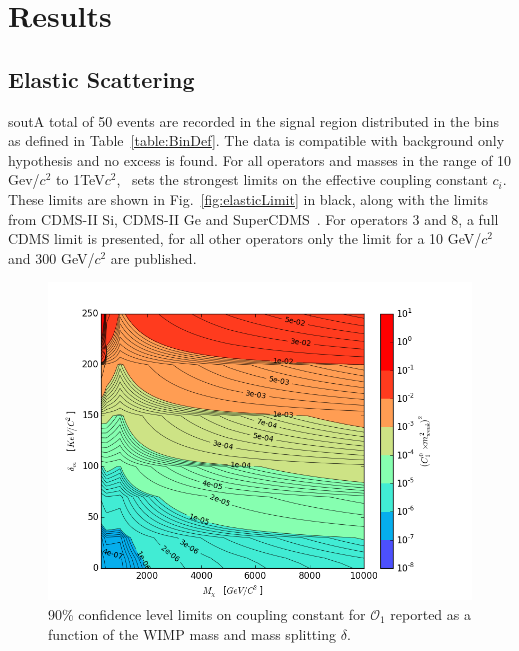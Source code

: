 \section{Results}
\subsection{Elastic Scattering}
sout{A total of 50 events are recorded in the signal region distributed in the bins as defined in Table~\ref{table:BinDef}.} The data is compatible with background only hypothesis and no excess is found. For all operators and masses in the range of 10 Gev/$c^2$ to 1TeV$c^2$, \Xehund\ sets the strongest limits on the effective coupling constant $c_i$. These limits are shown in Fig.~\ref{fig:elasticLimit} in black, along with the limits from CDMS-II Si, CDMS-II Ge and SuperCDMS~\cite{CDMSEFT}. For operators 3 and 8, a full CDMS limit is presented, for all other operators only the limit for a 10 GeV/$c^2$ and 300 GeV/$c^2$ are published.  

\begin{figure}[h!]
\centerline{\includegraphics[width=1.\linewidth]{Figures/inelastic_delta_vs_m.png}}
\caption{90\% confidence level limits on coupling constant for $\mathcal{O}_1$ reported as a function of the WIMP mass and mass splitting $\delta$.}
\label{fig:O1Inel}
\end{figure}  

